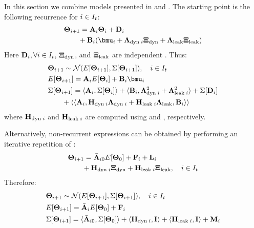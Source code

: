 In this section we combine models presented in  and . The starting point is the following recurrence for $i \in I_t$:
\begin{align} \equlabel{fourier-recurrence-noise-process-variation}
  & \vtemp_{i + 1} = \m{A}_i \vtemp_i + \m{D}_i \nonumber \\
  & {} \qquad + \m{B}_i (\vmean{i} + \ddev{\dyn \; i} \vnormal_\dyn + \ddev{\leak} \vnormal_\leak)
\end{align}
Here $\mathbf{D}_i, \forall i \in I_t$, $\mathbf{\Xi}_{\text{dyn}}$, and $\mathbf{\Xi}_{\text{leak}}$ are independent \mnrvs. Thus:
\begin{align*}
  & \vtemp_{i + 1} \sim \normal(\expect{\vtemp_{i + 1}}, \cov{\vtemp_{i + 1}}), \sep i \in \timeindex \\
  & \expect{\vtemp_{i + 1}} = \m{A}_i \expect{\vtemp_i} + \m{B}_i \vmean{i} \\
  & \cov{\vtemp_{i + 1}} = \dbl{\m{A}_i, \cov{\vtemp_i}} + \dbl{\m{B}_i, \ddev{\dyn \; i}^2 + \ddev{\leak \; i}^2} + \cov{\m{D}_i} \\
  & {} \qquad + \dbl{\dbl{\m{A}_i, \m{H}_{\dyn \; i} \ddev{\dyn \; i} + \m{H}_{\leak \; i} \ddev{\leak}, \m{B}_i}}
\end{align*}
where $\mathbf{H}_{\text{dyn} \; i}$ and $\mathbf{H}_{\text{leak} \; i}$ are computed using  and , respectively.

Alternatively, non-recurrent expressions can be obtained by performing an iterative repetition of :
\begin{align} \equlabel{fourier-non-recurrent-combined}
  & \vtemp_{i + 1} = \am{A}_{i0} \expect{\vtemp_0} + \v{F}_i + \v{L}_i \nonumber \\
  & { } \qquad + \v{H}_{\dyn \; i} \vnormal_\dyn + \v{H}_{\leak \; i} \vnormal_\leak, \sep i \in \timeindex
\end{align}
Therefore:
\begin{align*}
  & \mathbf{\Theta}_{i + 1} \sim \mathcal{N}(E[\mathbf{\Theta}_{i + 1}], \Sigma[\mathbf{\Theta}_{i + 1}]), \hspace{10pt} i \in I_t \\
  & E[\mathbf{\Theta}_{i + 1}] = \Bar{\mathbf{A}}_i E[\mathbf{\Theta}_0] + \mathbf{F}_i \\
  & \Sigma[\mathbf{\Theta}_{i + 1}] = \langle \Bar{\mathbf{A}}_{i0}, \Sigma[\mathbf{\Theta}_0] \rangle + \langle \mathbf{H}_{\text{dyn} \; i}, \mathbf{I} \rangle + \langle \mathbf{H}_{\text{leak} \; i}, \mathbf{I} \rangle + \mathbf{M}_i
\end{align*}
